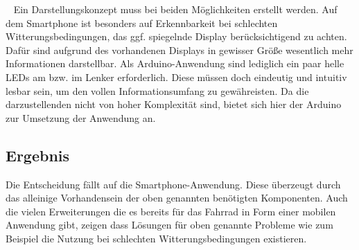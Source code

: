\begin{description}[leftmargin=0.7cm,style=nextline]
  \item[Darstellung] ~ Ein Darstellungskonzept muss bei beiden Möglichkeiten erstellt werden. Auf dem \gls{Smartphone} ist besonders auf Erkennbarkeit bei schlechten Witterungsbedingungen, das ggf. spiegelnde Display berücksichtigend zu achten. Dafür sind aufgrund des vorhandenen Displays in gewisser Größe wesentlich mehr Informationen darstellbar. Als \gls{Arduino}-Anwendung sind lediglich ein paar helle \glspl{LED} am bzw. im Lenker erforderlich. Diese müssen doch eindeutig und intuitiv lesbar sein, um den vollen Informationsumfang zu gewähreisten. Da die darzustellenden nicht von hoher Komplexität sind, bietet sich hier der Arduino zur Umsetzung der Anwendung an. \\
\end{description}
\subsection*{Ergebnis}  
Die Entscheidung fällt auf die \gls{Smartphone}-Anwendung. Diese überzeugt durch das alleinige Vorhandensein der oben genannten benötigten Komponenten. Auch die vielen Erweiterungen die es bereits für das Fahrrad in Form einer mobilen Anwendung gibt, zeigen dass Lösungen für oben genannte Probleme wie zum Beispiel die Nutzung bei schlechten Witterungsbedingungen existieren.

